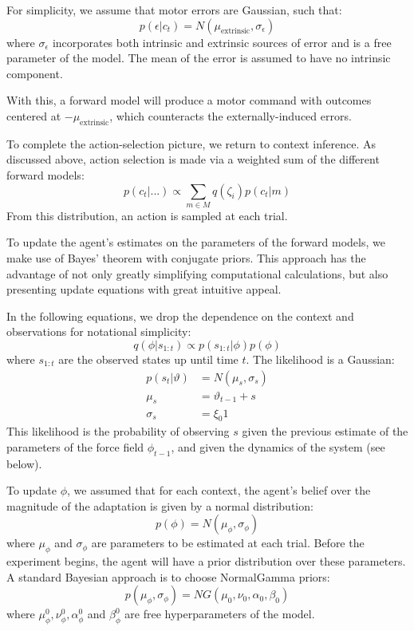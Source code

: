 \documentclass[a4paper,doc,floatsintext,natbib]{apa6}
\begin{document}
For simplicity, we assume that motor errors are Gaussian, such that:
\begin{equation}
p(\epsilon | c_t) = N(\mu_{\text{extrinsic}}, \sigma_\epsilon)
\end{equation}
where $\sigma_\epsilon$ incorporates both intrinsic and extrinsic sources of
error and is a free parameter of the model. The mean of the error is assumed to
have no intrinsic component.

With this, a forward model will produce a motor command with outcomes centered
at $-\mu_{\text{extrinsic}}$, which counteracts the externally-induced errors.

To complete the action-selection picture, we return to context inference. As
discussed above, action selection is made via a weighted sum of the different
forward models:
\begin{equation}
p(c_t | ...) \propto \displaystyle \sum_{m \in M} q(\zeta_i)p(c_t | m)
\end{equation}
From this distribution, an action is sampled at each trial.

To update the agent's estimates on the parameters of the forward models, we
make use of Bayes' theorem with conjugate priors. This approach has the
advantage of not only greatly simplifying computational calculations, but also
presenting update equations with great intuitive appeal.

In the following equations, we drop the dependence on the context and
observations for notational simplicity:
\begin{equation}
q(\phi | s_{1:t}) \propto p(s_{1:t} | \phi)p(\phi)
\end{equation}
where $s_{1:t}$ are the observed states up until time $t$. The likelihood is a
Gaussian:
\begin{align}
  p(s_t | \vartheta) &= N(\mu_s, \sigma_s)  \\
  \mu_s &= \vartheta_{t-1} + s \\
  \sigma_s &= \xi_0 1
\end{align}
This likelihood is the probability of observing $s$ given the previous estimate
of the parameters of the force field $\phi_{t-1}$, and given the dynamics of
the system (see below).

To update $\phi$, we assumed that for each context, the agent's belief over
the magnitude of the adaptation is given by a normal distribution:
\begin{equation}
p(\phi) = N(\mu_\phi, \sigma_\phi) \label{eqn:data-dist}
\end{equation}
where $\mu_\phi$ and $\sigma_\phi$ are parameters to be estimated at each
trial. Before the experiment begins, the agent will have a prior distribution
over these parameters. A standard Bayesian approach is to choose NormalGamma
priors:
\begin{equation}
p(\mu_\phi, \sigma_\phi) = NG(\mu_0, \nu_0, \alpha_0, \beta_0)
\end{equation}
where $\mu_{\phi}^0, \nu_{\phi}^0, \alpha_{\phi}^0$ and $\beta_{\phi}^0$ are free hyperparameters of the
model.
\end{document}
